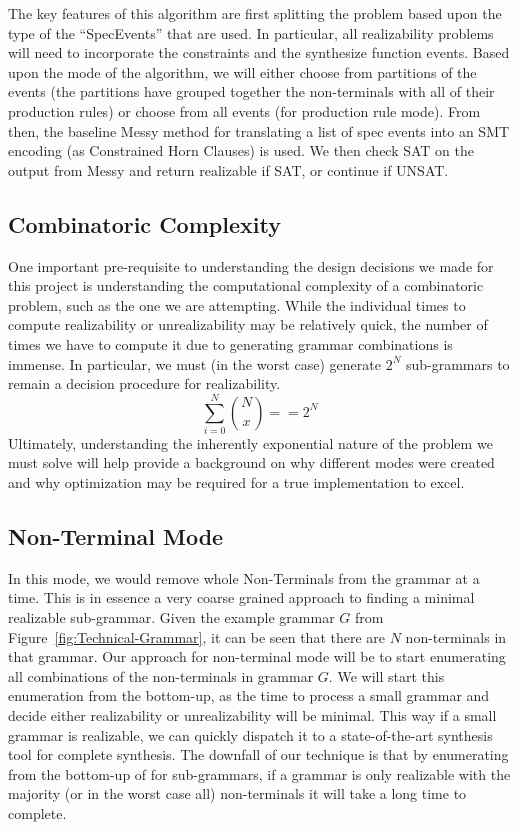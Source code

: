 \documentclass[acmsmall, nonacm]{acmart}
\begin{document}
The key features of this algorithm are first splitting the problem based upon the 
type of the ``SpecEvents'' that are used. In particular, all realizability problems will need to incorporate the constraints and the synthesize function events. Based upon the mode of the algorithm, we will either
choose from partitions of the events (the partitions have grouped together the non-terminals with all of their production rules) or choose from all events (for production rule mode).
From then, the baseline Messy method for translating a list of spec events into an SMT encoding (as Constrained Horn Clauses) is used. We then check SAT on the output from Messy and return realizable if SAT, or continue if UNSAT.

\subsection{Combinatoric Complexity}
One important pre-requisite to understanding the design decisions we made for this project is understanding the computational complexity of a combinatoric problem, such as the one we are attempting.
While the individual times to compute realizability or unrealizability may be
relatively quick, the number of times we have to compute it due to
generating grammar combinations is immense.
In particular, we must (in the worst case) generate $2^N$ sub-grammars to
remain a decision procedure for realizability.
$$\sum_{i = 0}^{N} {N \choose x} == 2^N$$
Ultimately, understanding the inherently exponential nature of the problem
we must solve will help provide a background on why different modes were created
and why optimization may be required for a true implementation to excel.


\subsection{Non-Terminal Mode}
In this mode, we would remove whole Non-Terminals from the grammar at a time.
This is in essence a very coarse grained approach to finding a minimal
realizable sub-grammar. Given the example grammar $G$ from Figure~\ref{fig:Technical-Grammar}, it can be seen that there are $N$ non-terminals in
that grammar.
Our approach for non-terminal mode will be to start enumerating all combinations
of the non-terminals in grammar $G$. We will start this enumeration from the bottom-up, as the time to process a small grammar and decide either
realizability or unrealizability will be minimal. This way if a small grammar
is realizable, we can quickly dispatch it to a state-of-the-art synthesis tool
for complete synthesis. The downfall of our technique is that by enumerating from the bottom-up of for sub-grammars, if a grammar is only realizable with the majority (or in the worst case all) non-terminals it will take a long time to complete.
\end{document}
